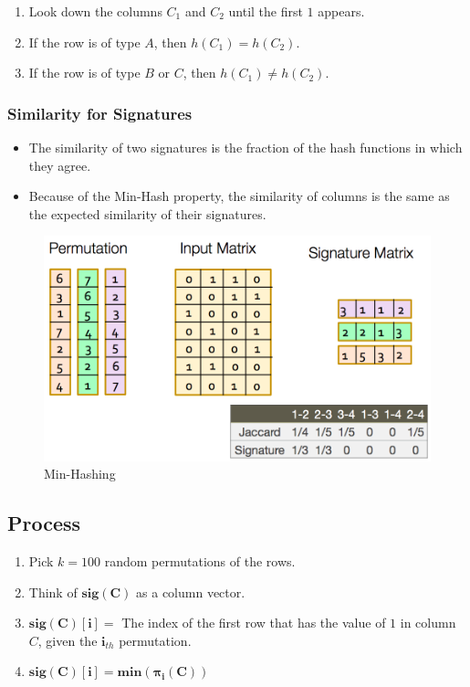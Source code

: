 \begin{enumerate}
 \item Look down the columns $C_1$ and $C_2$ until the first $1$ appears.
 \item If the row is of type $A$, then $h(C_1) = h(C_2)$.
 \item If the row is of type $B$ or $C$, then $h(C_1) \neq h(C_2)$.
\end{enumerate}

\subsubsection{Similarity for Signatures}
\begin{itemize}
 \item The similarity of two signatures is the fraction of the hash functions in which they agree.
 \item Because of the Min-Hash property, the similarity of columns is the same as the expected similarity of their signatures.
\end{itemize}

\bigskip
\begin{figure}[H]
 \centering
 \includegraphics[scale=0.35]{figures/minhashing.png}
 \caption{Min-Hashing}
\end{figure}

\subsection{Process}
\begin{enumerate}
 \item Pick $k=100$ random permutations of the rows.
 \item Think of $\bm{sig(C)}$ as a column vector.
 \item $\bm{sig(C)[i]} = $ The index of the first row that has the value of $1$ in column $C$, given the $\bm{i}_{th}$ permutation.
 \item $\bm{sig(C)[i]} = \bm{min\left(\pi_i(C)\right)}$ 
\end{enumerate}

